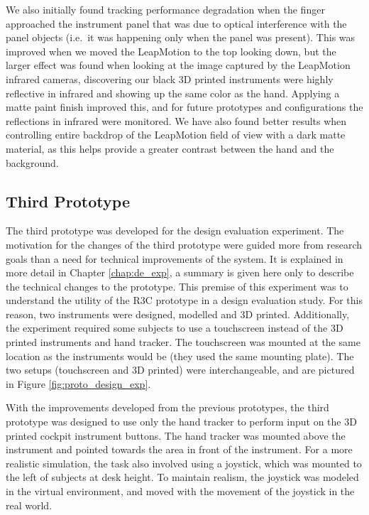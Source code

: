 We also initially found tracking performance degradation when the finger approached the instrument panel that was due to optical interference with the panel objects (i.e.\ it was happening only when the panel was present).
This was improved when we moved the LeapMotion to the top looking down, but the larger effect was found when looking at the image captured by the LeapMotion infrared cameras, discovering our black 3D printed instruments were highly reflective in infrared and showing up the same color as the hand.
Applying a matte paint finish improved this, and for future prototypes and configurations the reflections in infrared were monitored.
We have also found better results when controlling entire backdrop of the LeapMotion field of view with a dark matte material, as this helps provide a greater contrast between the hand and the background.


\subsection{Third Prototype}

The third prototype was developed for the design evaluation experiment.
The motivation for the changes of the third prototype were guided more from research goals than a need for technical improvements of the system.
It is explained in more detail in Chapter \ref{chap:de_exp}, a summary is given here only to describe the technical changes to the prototype.
This premise of this experiment was to understand the utility of the R3C prototype in a design evaluation study.
For this reason, two instruments were designed, modelled and 3D printed.
Additionally, the experiment required some subjects to use a touchscreen instead of the 3D printed instruments and hand tracker.
The touchscreen was mounted at the same location as the instruments would be (they used the same mounting plate).
The two setups (touchscreen and 3D printed) were interchangeable, and are pictured in Figure \ref{fig:proto_design_exp}.

With the improvements developed from the previous prototypes, the third prototype was designed to use only the hand tracker to perform input on the 3D printed cockpit instrument buttons.
The hand tracker was mounted above the instrument and pointed towards the area in front of the instrument.
For a more realistic simulation, the task also involved using a joystick, which was mounted to the left of subjects at desk height.
To maintain realism, the joystick was modeled in the virtual environment, and moved with the movement of the joystick in the real world.

